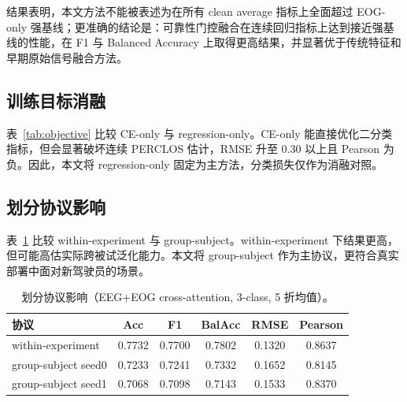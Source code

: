 \documentclass[UTF8,a4paper,10.5pt,fontset=windows]{ctexart}
\begin{document}
结果表明，本文方法不能被表述为在所有 clean average 指标上全面超过 EOG-only 强基线；更准确的结论是：可靠性门控融合在连续回归指标上达到接近强基线的性能，在 F1 与 Balanced Accuracy 上取得更高结果，并显著优于传统特征和早期原始信号融合方法。

\subsection{训练目标消融}
表~\ref{tab:objective} 比较 CE-only 与 regression-only。CE-only 能直接优化二分类指标，但会显著破坏连续 PERCLOS 估计，RMSE 升至 0.30 以上且 Pearson 为负。因此，本文将 regression-only 固定为主方法，分类损失仅作为消融对照。

\begin{table}[H]
\centering
\caption{训练目标消融（group-subject, binary, 5 折均值）。}
\label{tab:objective}
\end{table}

\subsection{划分协议影响}
表~\ref{tab:split} 比较 within-experiment 与 group-subject。within-experiment 下结果更高，但可能高估实际跨被试泛化能力。本文将 group-subject 作为主协议，更符合真实部署中面对新驾驶员的场景。

\begin{table}[H]
\centering
\caption{划分协议影响（EEG+EOG cross-attention, 3-class, 5 折均值）。}
\label{tab:split}
\begin{tabular}{lccccc}
\toprule
协议 & Acc & F1 & BalAcc & RMSE & Pearson \\
\midrule
within-experiment & 0.7732 & 0.7700 & 0.7802 & 0.1320 & 0.8637 \\
group-subject seed0 & 0.7233 & 0.7241 & 0.7332 & 0.1652 & 0.8145 \\
group-subject seed1 & 0.7068 & 0.7098 & 0.7143 & 0.1533 & 0.8370 \\
\bottomrule
\end{tabular}
\end{table}
\end{document}
